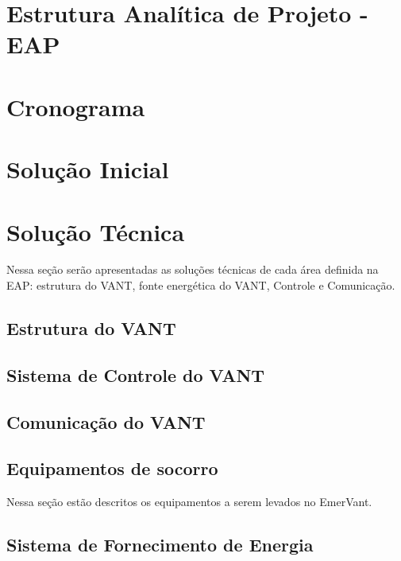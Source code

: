 \section{Estrutura Analítica de Projeto - EAP}
  
 
\pagebreak
\section{Cronograma}
  

\section{Solução Inicial}
  

\section{Solução Técnica}
  Nessa seção serão apresentadas as soluções técnicas de cada área definida na EAP: estrutura do VANT,
  fonte energética do VANT, Controle e Comunicação.

\subsection{Estrutura do VANT}
  
  
\subsection{Sistema de Controle do VANT}
  

\subsection{Comunicação do VANT}
  

\subsection{Equipamentos de socorro}
  Nessa seção estão descritos os equipamentos a serem levados no EmerVant.
  
  

\subsection{Sistema de Fornecimento de Energia}
  



